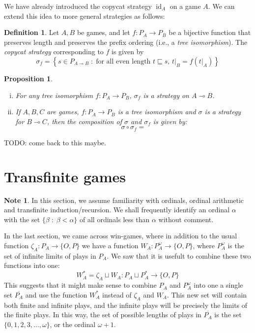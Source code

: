 \documentclass[11pt]{article} %
\theoremstyle{plain} %
\newtheorem{proposition}[theorem]{Proposition}
\theoremstyle{definition} %
\newtheorem{definition}[theorem]{Definition}
\theoremstyle{note}
\newtheorem{note}[theorem]{Note}
\theoremstyle{exercisestyle}
\newcommand*\from{\colon}
\newcommand{\cmap}[3]{#1\from{}#2\to{}#3}
\DeclareMathOperator{\id}{id}
\renewcommand{\implies}{\multimap}
\newcommand{\comp}[2]{#1 \circ #2}
\newcommand{\cprd}{\sqcup}
\newcommand{\suchthat}{\;\colon\;}
\newcommand{\OP}{\{O,P\}}
\newcommand{\prefix}{\sqsubseteq}
\begin{document}
We have already introduced the copycat strategy $\id_A$ on a game $A$.  We can extend this idea to more general strategies as follows:

\begin{definition}
  Let $A,B$ be games, and let $\cmap{f}{P_A}{P_B}$ be a bijective function that preserves length and preserves the prefix ordering (i.e., a \emph{tree isomorphism}).  The \emph{copycat strategy} corresponding to $f$ is given by
  \[
    \sigma_f = \left\{s\in P_{A\implies B}\suchthat\textrm{for all even length $t\prefix s$, $t\vert_B=f(t\vert_A)$}\right\}
    \]
\end{definition}

\begin{proposition}
  \begin{enumerate}[i)]
    \item For any tree isomorphism $\cmap{f}{P_A}{P_B}$, $\sigma_f$ is a strategy on $A\implies B$.

    \item If $A,B,C$ are games, $\cmap{f}{P_A}{P_B}$ is a tree isomorphism and $\sigma$ is a strategy for $B\implies C$, then the composition of $\sigma$ and $\sigma_f$ is given by:
      \[
        \comp\sigma{\sigma_f} =
        \]
  \end{enumerate}
\end{proposition}

TODO: come back to this maybe.

\section{Transfinite games}

\begin{note}
  In this section, we assume familiarity with ordinals, ordinal arithmetic and transfinite induction/recursion.  We shall frequently identify an ordinal $\alpha$ with the set $\{\beta\suchthat\beta<\alpha\}$ of all ordinals less than $\alpha$ without comment.
\end{note}

In the last section, we came across win-games, where in addition to the usual function $\cmap{\zeta_A}{P_A}{\OP}$ we have a function $\cmap{W_A}{P_A^\omega}{\OP}$, where $P_A^\omega$ is the set of infinite limits of plays in $P_A$.  We saw that it is usefult to combine these two functions into one:
\[
  W_A^* = \zeta_A\cprd W_A\from P_A\cprd P_A^*\to\OP
  \]
This suggests that it might make sense to combine $P_A$ and $P_A^\omega$ into one a single set $\overline{P_A}$ and use the function $W_A^*$ instead of $\zeta_A$ and $W_A$.  This new set will contain both finite and infinite plays, and the infinite plays will be precisely the limits of the finite plays.  In this way, the set of possible lengths of plays in $\overline{P_A}$ is the set $\{0,1,2,3,\dots,\omega\}$, or the ordinal $\omega+1$.  
\end{document}
